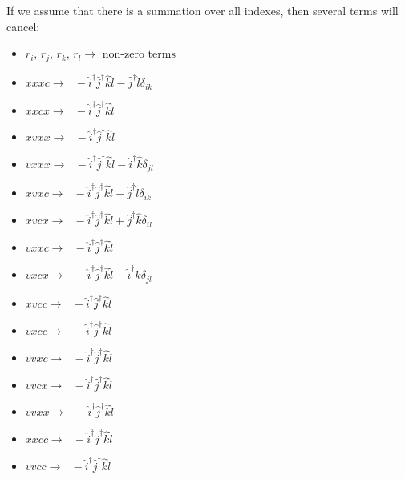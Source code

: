 \documentclass[12pt]{article}
\begin{document}
If we assume that there is a summation over all indexes, then several terms will cancel:
\begin{itemize} 
\item $r_{i} \text{, \ }r_{j}\text{, \ } r_{k} \text{, \ } r_{l}   \rightarrow \text{ \ \ \ \  non-zero terms }$

\item $xxxc \rightarrow \text{ \ \ \ \ } -\hat{i}^{\dagger} \hat{j}^{\dagger} \hat{k}\hat{l} - \hat{j}^{\dagger} \hat{l} \delta_{ik}$

\item $xxcx \rightarrow \text{ \ \ \ \ } -\hat{i}^{\dagger} \hat{j}^{\dagger} \hat{k}\hat{l}  $

\item $xvxx \rightarrow \text{ \ \ \ \ } -\hat{i}^{\dagger} \hat{j}^{\dagger} \hat{k}\hat{l}$

\item $vxxx \rightarrow \text{ \ \ \ \ } -\hat{i}^{\dagger} \hat{j}^{\dagger} \hat{k}\hat{l} - \hat{i}^{\dagger} \hat{k} \delta_{jl}$

\item $xvxc \rightarrow \text{ \ \ \ \ } -\hat{i}^{\dagger} \hat{j}^{\dagger} \hat{k}\hat{l} - \hat{j}^{\dagger} \hat{l} \delta_{ik}$

\item $xvcx \rightarrow \text{ \ \ \ \ } -\hat{i}^{\dagger} \hat{j}^{\dagger} \hat{k}\hat{l} + \hat{j}^{\dagger} \hat{k} \delta_{il}$

\item $vxxc \rightarrow \text{ \ \ \ \ } -\hat{i}^{\dagger} \hat{j}^{\dagger} \hat{k}\hat{l}$

\item $vxcx \rightarrow \text{ \ \ \ \ } -\hat{i}^{\dagger} \hat{j}^{\dagger} \hat{k}\hat{l} - \hat{i}^{\dagger} \hat{k} \delta_{jl}$

\item $xvcc \rightarrow \text{ \ \ \ \ } -\hat{i}^{\dagger} \hat{j}^{\dagger} \hat{k}\hat{l}$

\item $vxcc \rightarrow \text{ \ \ \ \ } -\hat{i}^{\dagger} \hat{j}^{\dagger} \hat{k}\hat{l}$

\item $vvxc \rightarrow \text{ \ \ \ \ } -\hat{i}^{\dagger} \hat{j}^{\dagger} \hat{k}\hat{l}$

\item $vvcx \rightarrow \text{ \ \ \ \ } -\hat{i}^{\dagger} \hat{j}^{\dagger} \hat{k}\hat{l}$

\item $vvxx \rightarrow \text{ \ \ \ \ } -\hat{i}^{\dagger} \hat{j}^{\dagger} \hat{k}\hat{l}$

\item $xxcc \rightarrow \text{ \ \ \ \ } -\hat{i}^{\dagger} \hat{j}^{\dagger} \hat{k}\hat{l} $

\item $vvcc \rightarrow \text{ \ \ \ \ } -\hat{i}^{\dagger} \hat{j}^{\dagger} \hat{k}\hat{l}$
\end{itemize}
\end{document}

